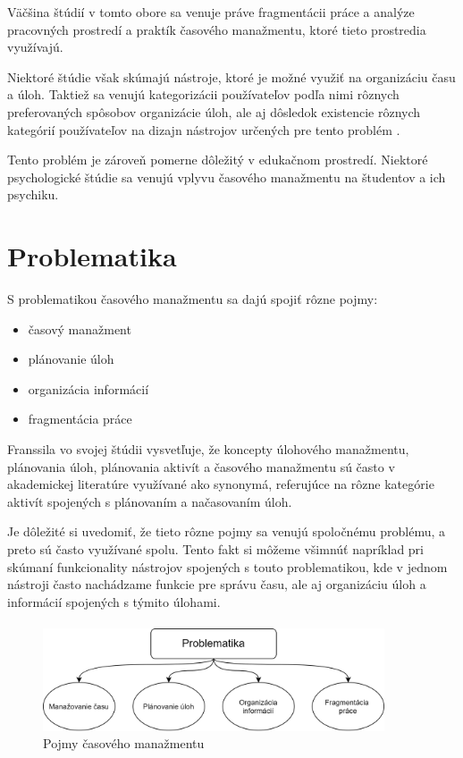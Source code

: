 \documentclass[10pt,slovak,a4paper]{article}
\begin{document}
	Väčšina štúdií v tomto obore \cite{Franssila,NoTask,Blandford} sa venuje práve fragmentácii práce a analýze pracovných prostredí a praktík časového manažmentu, ktoré tieto prostredia využívajú.
	
	Niektoré štúdie \cite{Franssila, Blandford, Haraty} však skúmajú nástroje, ktoré je možné využiť na organizáciu času a úloh. Taktiež sa venujú kategorizácii používateľov podľa nimi rôznych preferovaných spôsobov organizácie úloh, ale aj dôsledok existencie rôznych kategórií používateľov na dizajn nástrojov určených pre tento problém \cite{Haraty}.
	
	Tento problém je zároveň pomerne dôležitý v edukačnom prostredí. Niektoré psychologické štúdie \cite{Macan} sa venujú vplyvu časového manažmentu na študentov a ich psychiku.
	
\section{Problematika}

	S problematikou časového manažmentu sa dajú spojiť rôzne pojmy:
	\begin{itemize}
		\item časový manažment
		\item plánovanie úloh
		\item organizácia informácií
		\item fragmentácia práce
	\end{itemize}

	Franssila vo svojej štúdii\cite{Franssila} vysvetľuje, že koncepty úlohového manažmentu, plánovania úloh, plánovania aktivít a časového manažmentu sú často v akademickej literatúre využívané ako synonymá, referujúce na rôzne kategórie aktivít spojených s plánovaním a načasovaním úloh\cite{Franssila}.
	
	Je dôležité si uvedomiť, že tieto rôzne pojmy sa venujú spoločnému problému, a preto sú často využívané spolu. Tento fakt si môžeme všimnúť napríklad pri skúmaní funkcionality nástrojov spojených s touto problematikou, kde v jednom nástroji často nachádzame funkcie pre správu času, ale aj organizáciu úloh a informácií spojených s týmito úlohami.
	
	\paragraph{}
	\begin{figure}[tbh]
		\centering
		\includegraphics[width=0.9\textwidth]{problematika.png}
	\caption{Pojmy časového manažmentu}
	\label{f:pojmy}
	\end{figure}
	
\end{document}
